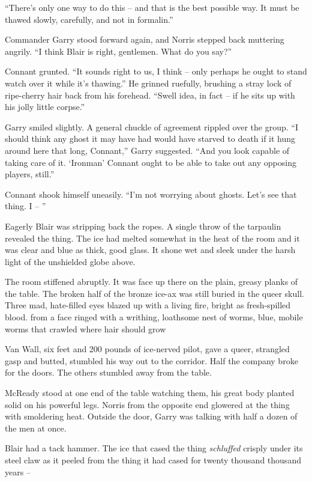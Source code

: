 \documentclass[letterpaper,openany,12pt]{memoir}		%
\begin{document}
``There's only one way to do this -- and that is the best possible way. It must
be thawed slowly, carefully, and not in formalin.''

Commander Garry stood forward again, and Norris stepped back muttering angrily.
``I think Blair is right, gentlemen. What do you say?''

Connant grunted. ``It sounds right to us, I think -- only perhaps he ought to
stand watch over it while it's thawing.'' He grinned ruefully, brushing a stray
lock of ripe-cherry hair back from his forehead. ``Swell idea, in fact -- if he
sits up with his jolly little corpse.''

Garry smiled slightly. A general chuckle of agreement rippled over the group.
``I should think any ghost it may have had would have starved to death if it
hung around here that long, Connant,'' Garry suggested. ``And you look capable
of taking care of it. `Ironman' Connant ought to be able to take out any
opposing players, still.''

Connant shook himself uneasily. ``I'm not worrying about ghosts. Let's see that
thing. I -- ''

Eagerly Blair was stripping back the ropes. A single throw of the tarpaulin
revealed the thing. The ice had melted somewhat in the heat of the room and it
was clear and blue as thick, good glass. It shone wet and sleek under the harsh
light of the unshielded globe above.

The room stiffened abruptly. It was face up there on the plain, greasy planks of
the table. The broken half of the bronze ice-ax was still buried in the queer
skull. Three mad, hate-filled eyes blazed up with a living fire, bright as
fresh-spilled blood. from a face ringed with a writhing, loathsome nest of
worms, blue, mobile worms that crawled where hair should grow

Van Wall, six feet and 200 pounds of ice-nerved pilot, gave a queer, strangled
gasp and butted, stumbled his way out to the corridor. Half the company broke
for the doors. The others stumbled away from the table.

McReady stood at one end of the table watching them, his great body planted
solid on his powerful legs. Norris from the opposite end glowered at the thing
with smoldering heat. Outside the door, Garry was talking with half a dozen of
the men at once.

Blair had a tack hammer. The ice that cased the thing \emph{schluffed} crisply
under its steel claw as it peeled from the thing it had cased for twenty
thousand thousand years --
\end{document}
